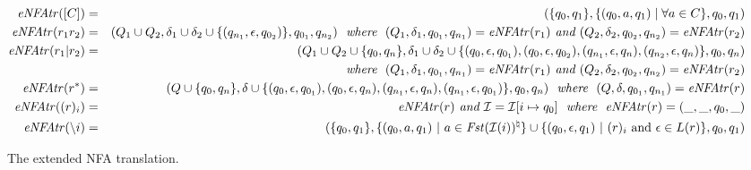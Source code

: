 \documentclass[conference]{IEEEtran}
\newcommand{\follow}{\textit{Fst}}
\newcommand{\toENFA}{{\it eNFAtr}}
\begin{document}
\begin{figure*}
\begin{center}
\small
\begin{eqnarray*}
\toENFA([C]) & = & (\{q_0,q_1\}, \{(q_0, a, q_1) \mid \forall a \in C \}, q_0, q_1 )\\
\toENFA(r_1r_2) & = & (Q_1 \cup Q_2, \delta_1 \cup \delta_2 \cup \{ (q_{n_1}, \epsilon, q_{0_2}) \}, q_{0_1}, q_{n_2} )
	\ \ \textit{where} \ \ (Q_1, \delta_1, q_{0_1}, q_{n_1}) = \toENFA(r_1) \textit{ and } (Q_2, \delta_2, q_{0_2}, q_{n_2}) = \toENFA(r_2)\\	
\toENFA(r_1 | r_2) & = & (Q_1 \cup Q_2 \cup \{ q_0, q_n \}, \delta_1 \cup \delta_2 \cup \{ (q_0, \epsilon, q_{0_1}), (q_0, \epsilon, q_{0_2}), (q_{n_1}, \epsilon, q_n), (q_{n_2}, \epsilon, q_n) \}, q_0, q_n)  \\
	&& \textit{where} \ \ (Q_1, \delta_1, q_{0_1}, q_{n_1}) = \toENFA(r_1) \textit{ and } (Q_2, \delta_2, q_{0_2}, q_{n_2}) = \toENFA(r_2)\\	
\toENFA(r^*) & = & (Q \cup \{ q_0, q_n \}, \delta \cup \{ (q_0, \epsilon,q_{0_1}), (q_0, \epsilon, q_n), (q_{n_1}, \epsilon, q_n), (q_{n_1}, \epsilon, q_{0_1}) \}, q_0, q_n) \ \ \textit{where} \ \ (Q, \delta, q_{0_1}, q_{n_1}) = \toENFA(r)\\
\toENFA((r)_i) & = & \toENFA(r) \textit{ and } \mathcal{I} = \mathcal{I}[i \mapsto q_0] \ \ \textit{where} \ \ \toENFA(r) = (\_,\_,q_0,\_) \\
\toENFA(\backslash i) & = & (\{q_0, q_1\}, \{ (q_0, a, q_1) ~|~ a \in \text{\follow($\mathcal{I}(i)$)$^{\natural}$} \} \cup \{ (q_0, \epsilon, q_1) ~|~ (r)_i \mbox{ and } \epsilon \in L(r) \}, q_0, q_1 )
\end{eqnarray*}
\end{center}
\caption{The extended NFA translation.}
\label{fig:toenfa}
\end{figure*}
\end{document}
